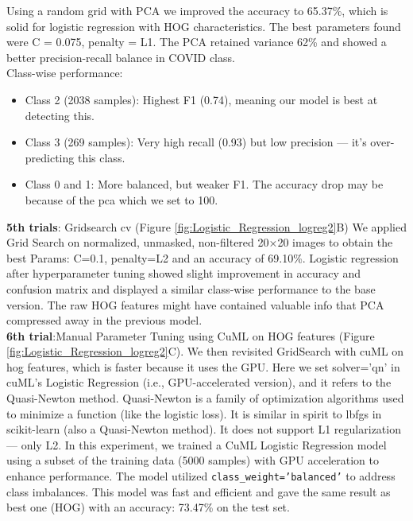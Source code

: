 \documentclass{article}
\begin{document}
Using a random grid with PCA we improved the accuracy to 65.37\%, which is solid for logistic regression with HOG characteristics. The best parameters found were C = 0.075, penalty = L1. The PCA retained variance 62\% and showed a better precision-recall balance in COVID class.\\
Class-wise performance: 
\begin{itemize}
    \item Class 2 (2038 samples): Highest F1 (0.74), meaning our model is best at detecting this.
    \item Class 3 (269 samples): Very high recall (0.93) but low precision — it’s over-predicting this class.
    \item Class 0 and 1: More balanced, but weaker F1.
The accuracy drop may be because of the pca which we set to 100.
\end{itemize}

\textbf{5th trials}: Gridsearch cv (Figure \ref{fig:Logistic_Regression_logreg2}B)
We applied Grid Search on normalized, unmasked, non-filtered 20×20 images to obtain the best Params: C=0.1, penalty=L2 and an accuracy of 69.10\%.
Logistic regression after hyperparameter tuning showed slight improvement in accuracy and confusion matrix and displayed a	similar class-wise performance to the base version. The raw HOG features might have contained valuable info that PCA compressed away in the previous model.
\\
\textbf{6th trial}:Manual Parameter Tuning using CuML on HOG features (Figure \ref{fig:Logistic_Regression_logreg2}C).
We then revisited GridSearch with cuML on hog features, which is faster because it uses the GPU.
Here we set solver='qn' in cuML's Logistic Regression (i.e., GPU-accelerated version), and it refers to the Quasi-Newton method.
Quasi-Newton is a family of optimization algorithms used to minimize a function (like the logistic loss).
It is similar in spirit to lbfgs in scikit-learn (also a Quasi-Newton method). It does not support L1 regularization — only L2.
In this experiment, we trained a CuML Logistic Regression model using a subset of the training data (5000 samples) with GPU acceleration to enhance performance. The model utilized \texttt{class\_weight='balanced'} to address class imbalances. This model was fast and efficient and gave the same result as best one (HOG) with an accuracy: 73.47\% on the test set.
\end{document}
